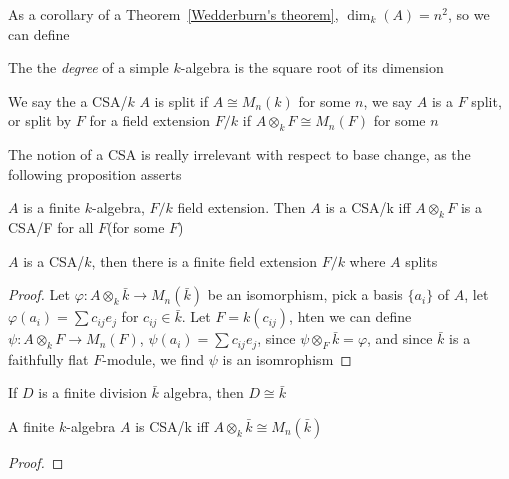 \documentclass[a4paper,10pt]{article}
\begin{document}
As a corollary of a Theorem~\ref{Wedderburn's theorem}, $\dim_k(A)=n^2$, so we can define

\begin{definition}
The the \textit{degree} of a simple $k$-algebra is the square root of its dimension
\end{definition}

\begin{definition}
We say the a CSA/$k$ $A$ is split if $A\cong M_n(k)$ for some $n$, we say $A$ is a $F$ split, or split by $F$ for a field extension $F/k$ if $A\otimes_kF\cong M_n(F)$ for some $n$
\end{definition}

The notion of a CSA is really irrelevant with respect to base change, as the following proposition asserts

\begin{proposition}
$A$ is a finite $k$-algebra, $F/k$ field extension. Then $A$ is a CSA/k iff $A\otimes_kF$ is a CSA/F for all $F$(for some $F$)
\end{proposition}

\begin{corollary}
$A$ is a CSA/$k$, then there is a finite field extension $F/k$ where $A$ splits
\end{corollary}

\begin{proof}
Let $\varphi:A\otimes_k\bar k\to M_n(\bar k)$ be an isomorphism, pick a basis $\{a_i\}$ of $A$, let $\varphi(a_i)=\sum c_{ij}e_j$ for $c_{ij}\in\bar k$. Let $F=k(c_{ij})$, hten we can define $\psi:A\otimes_kF\to M_n(F)$, $\psi(a_i)=\sum c_{ij}e_j$, since $\psi\otimes_F\bar k=\varphi$, and since $\bar k$ is a faithfully flat $F$-module, we find $\psi$ is an isomrophism
\end{proof}

\begin{lemma}
If $D$ is a finite division $\bar k$ algebra, then $D\cong \bar k$
\end{lemma}

\begin{theorem}
A finite $k$-algebra $A$ is CSA/k iff $A\otimes_k\bar k\cong M_n(\bar k)$
\end{theorem}

\begin{proof}

\end{proof}
\end{document}
